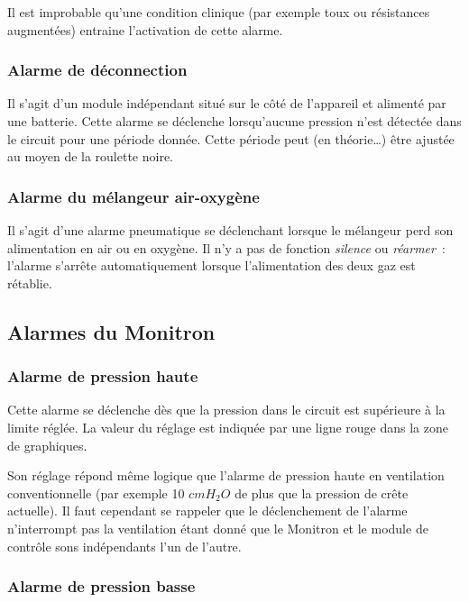 \documentclass[letterpaper, titlepage]{article}
\begin{document}
Il est improbable qu'une condition clinique (par exemple toux ou
résistances augmentées) entraine l'activation de cette alarme.

\subsubsection*{Alarme de déconnection}

Il s'agit d'un module indépendant situé sur le côté de l'appareil et
alimenté par une batterie. Cette alarme se déclenche lorsqu'aucune
pression n'est détectée dans le circuit pour une période donnée. Cette
période peut (en théorie\ldots{}) être ajustée au moyen de la roulette
noire.

\subsubsection*{Alarme du mélangeur air-oxygène}

Il s'agit d'une alarme pneumatique se déclenchant lorsque le mélangeur
perd son alimentation en air ou en oxygène. Il n'y a pas de fonction
\emph{silence} ou \emph{réarmer~}: l'alarme s'arrête automatiquement
lorsque l'alimentation des deux gaz est rétablie.

\subsection{Alarmes du Monitron}

\subsubsection*{Alarme de pression haute}%

Cette alarme se déclenche dès que la pression dans le circuit est
supérieure à la limite réglée. La valeur du réglage est indiquée par une
ligne rouge dans la zone de graphiques.

Son réglage répond même logique que l'alarme de pression haute en
ventilation conventionnelle (par exemple 10 $cmH_2O$ de plus que la
pression de crête actuelle). Il faut cependant se rappeler que le
déclenchement de l'alarme n'interrompt pas la ventilation étant donné
que le Monitron et le module de contrôle sons indépendants l'un de
l'autre.

\subsubsection*{Alarme de pression basse}
\end{document}
